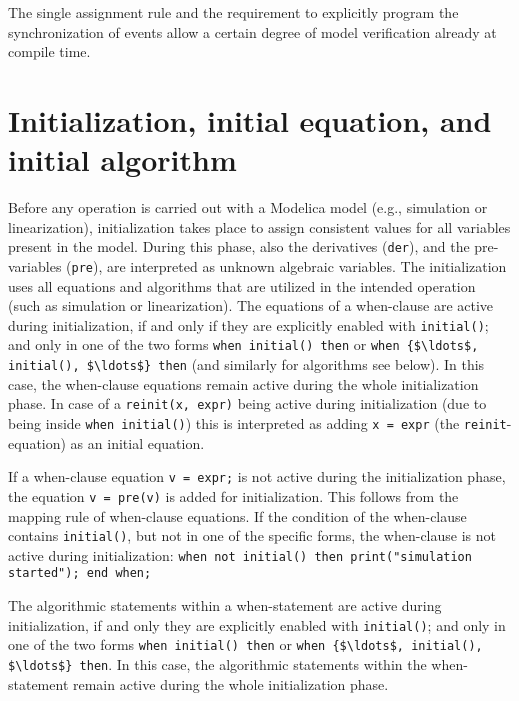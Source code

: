 \begin{nonnormative}
The single assignment rule and the requirement to explicitly
program the synchronization of events allow a certain degree of model
verification already at compile time.
\end{nonnormative}

\section{Initialization, initial equation, and initial algorithm}

Before any operation is carried out with a Modelica model (e.g.,
simulation or linearization), initialization takes place to assign
consistent values for all variables present in the model. During this
phase, also the derivatives (\lstinline!der!), and the pre-variables (\lstinline!pre!),
are interpreted as unknown algebraic variables. The initialization uses
all equations and algorithms that are utilized in the intended operation
(such as simulation or linearization).  The equations of a
when-clause are active during initialization, if and only if they are
explicitly enabled with \lstinline!initial()!; and only in one of the
two forms \lstinline!when initial() then! or \lstinline!when {$\ldots$, initial(), $\ldots$} then!
(and similarly for algorithms see below). In this case, the when-clause equations remain active during the
whole initialization phase. In case of a
\lstinline!reinit(x, expr)! being active during initialization (due to being inside
\lstinline!when initial()!) this is interpreted as adding \lstinline!x = expr! (the
\lstinline!reinit!-equation) as an initial equation.

\begin{nonnormative}
If a when-clause equation \lstinline!v = expr;! is not active during the initialization phase, the equation \lstinline!v = pre(v)! is added for
initialization.  This follows from the mapping rule of when-clause equations.  If the condition of the when-clause contains \lstinline!initial()!,
but not in one of the specific forms, the when-clause is not active during initialization: \lstinline!when not initial() then print("simulation started"); end when;!
\end{nonnormative}

The algorithmic statements within a when-statement are active during initialization, if and only they are
explicitly enabled with \lstinline!initial()!; and only in one of the
two forms \lstinline!when initial() then! or \lstinline!when {$\ldots$, initial(), $\ldots$} then!.
In this case, the algorithmic statements within the when-statement remain active during the whole initialization phase.

